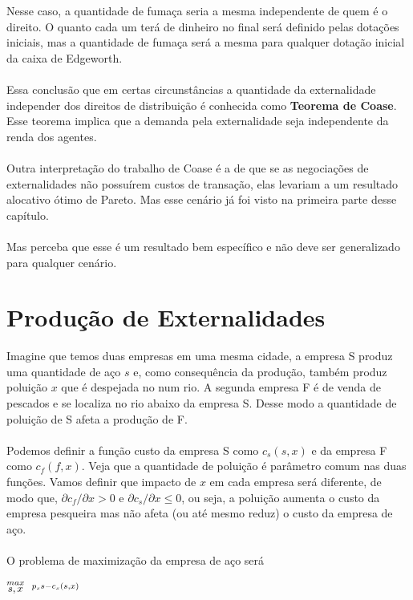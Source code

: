 \documentclass[a4paper,11pt,oneside]{book}
\theoremstyle{definition}
\theoremstyle{break}
\begin{document}
Nesse caso, a quantidade de fumaça seria a mesma independente de quem é o direito. O quanto cada um terá de dinheiro no final será definido pelas dotações iniciais, mas a quantidade de fumaça será a mesma para qualquer dotação inicial da caixa de Edgeworth.
\\
\\
Essa conclusão que em certas circunstâncias a quantidade da externalidade independer dos direitos de distribuição é conhecida como \textbf{Teorema de Coase}. Esse teorema implica que a demanda pela externalidade seja independente da renda dos agentes.
\\
\\
Outra interpretação do trabalho de Coase é a de que se as negociações de externalidades não possuírem custos de transação, elas levariam a um resultado alocativo ótimo de Pareto. Mas esse cenário já foi visto na primeira parte desse capítulo.
\\
\\
Mas perceba que esse é um resultado bem específico e não deve ser generalizado para qualquer cenário.

\section{Produção de Externalidades}

Imagine que temos duas empresas em uma mesma cidade, a empresa S produz uma quantidade de aço $s$ e, como consequência da produção, também produz poluição $x$ que é despejada no num rio. A segunda empresa F é de venda de pescados e se localiza no rio abaixo da empresa S. Desse modo a quantidade de poluição de S afeta a produção de F.
\\
\\
Podemos definir a função custo da empresa S como $c_s(s,x)$ e da empresa F como $c_f(f,x)$. Veja que a quantidade de poluição é parâmetro comum nas duas funções. Vamos definir que impacto de $x$ em cada empresa será diferente, de modo que, $\partial c_f/ \partial x > 0$ e $\partial c_s/ \partial x \leq 0$, ou seja, a poluição aumenta o custo da empresa pesqueira mas não afeta (ou até mesmo reduz) o custo da empresa de aço.
\\
\\
O problema de maximização da empresa de aço será

\begin{center}
	\LARGE $ \stackrel{max}{\text{\small $s,x$}} \ \ %
	\stackrel{p_s s - c_s(s,x)}{\ } $ %
\end{center}
\end{document}

